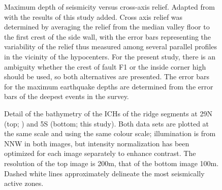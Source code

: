 \documentclass[jgr]{agu2001}
\begin{document}
\begin{figure}

\caption{Maximum depth of seismicity versus cross-axis relief. Adapted from
  \protect\citet{barclay01} with the results of this study added. 
Cross axis relief was determined by averaging the relief from the median valley
floor to the first crest of the side wall, with the error bars representing the 
variability of the relief thus measured among several parallel profiles in the
vicinity of the hypocenters.  For the present study, there is an 
ambiguity whether the crest of fault F1 or the inside corner high should be used,
so both alternatives are presented.  The error bars for the maximum earthquake depths
are determined from the error bars of the deepest events in the survey.}
\label{fig:maxdep-topo}
\end{figure}

\begin{figure}
\caption{Detail of the bathymetry of the ICHs of the ridge segments at
29\dg N (top; \citet{wolfe95}) and 5\dg S (bottom; this study).  Both
data sets are plotted at the same scale and using the same colour
scale; illumination is from NNW in both images, but intensity
normalization  has been optimized for each image separately to enhance contrast.  The resolution of the top image is 200m, that of
the bottom image 100m. 
Dashed white
lines approximately delineate the most seismically active zones.}
\label{fig:topo-cmp}
\end{figure}


\setcounter{figure}{0}
\renewcommand{\thefigure}{A\arabic{figure}}

\setcounter{table}{0}
\renewcommand{\thetable}{A\arabic{table}}


\clearpage

%

\begin{table}
%
\label{tbl:stations}
\end{table}


\clearpage
\end{document}

